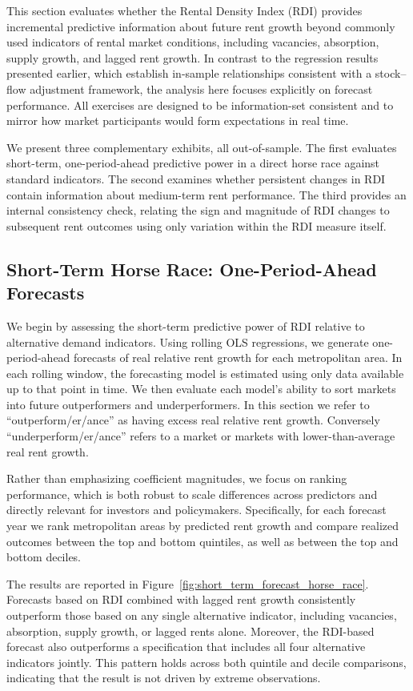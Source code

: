 \documentclass[pdflatex,sn-basic]{sn-jnl}%
\theoremstyle{thmstyleone}%
\theoremstyle{thmstyletwo}%
\theoremstyle{thmstylethree}%
\begin{document}
This section evaluates whether the Rental Density Index (RDI) provides incremental predictive information about future rent growth beyond commonly used indicators of rental market conditions, including vacancies, absorption, supply growth, and lagged rent growth. In contrast to the regression results presented earlier, which establish in-sample relationships consistent with a stock–flow adjustment framework, the analysis here focuses explicitly on forecast performance. All exercises are designed to be information-set consistent and to mirror how market participants would form expectations in real time.

We present three complementary exhibits, all out-of-sample. The first evaluates short-term, one-period-ahead predictive power in a direct horse race against standard indicators. The second examines whether persistent changes in RDI contain information about medium-term rent performance. The third provides an internal consistency check, relating the sign and magnitude of RDI changes to subsequent rent outcomes using only variation within the RDI measure itself.
\subsection{Short-Term Horse Race: One-Period-Ahead Forecasts}

We begin by assessing the short-term predictive power of RDI relative to alternative demand indicators. Using rolling OLS regressions, we generate one-period-ahead forecasts of real relative rent growth for each metropolitan area. In each rolling window, the forecasting model is estimated using only data available up to that point in time. We then evaluate each model’s ability to sort markets into future outperformers and underperformers. In this section we refer to  ``outperform/er/ance'' as having excess real relative rent growth. Conversely ``underperform/er/ance'' refers to a market or markets with lower-than-average real rent growth. 

Rather than emphasizing coefficient magnitudes, we focus on ranking performance, which is both robust to scale differences across predictors and directly relevant for investors and policymakers. Specifically, for each forecast year we rank metropolitan areas by predicted rent growth and compare realized outcomes between the top and bottom quintiles, as well as between the top and bottom deciles.

The results are reported in Figure~\ref{fig:short_term_forecast_horse_race}. Forecasts based on RDI combined with lagged rent growth consistently outperform those based on any single alternative indicator, including vacancies, absorption, supply growth, or lagged rents alone. Moreover, the RDI-based forecast also outperforms a specification that includes all four alternative indicators jointly. This pattern holds across both quintile and decile comparisons, indicating that the result is not driven by extreme observations.
\end{document}
